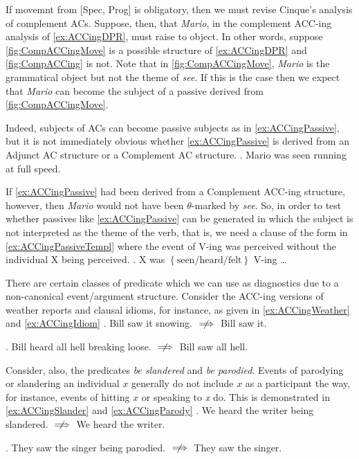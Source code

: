 \documentclass[MilwayThesis]{subfiles}
\begin{document}
If movemnt from [Spec, Prog] is obligatory, then we must revise Cinque's analysis of complement ACs.
Suppose, then, that \textit{Mario}, in the complement ACC-ing analysis of \cref{ex:ACCingDPR}, must raise to object.
In other words, suppose \cref{fig:CompACCingMove} is a possible structure of \cref{ex:ACCingDPR} and \cref{fig:CompACCing} is not.
Note that in \cref{fig:CompACCingMove}, \textit{Mario} is the grammatical object but not the theme of \textit{see}.
If this is the case then we expect that \textit{Mario} can become the subject of a passive derived from \cref{fig:CompACCingMove}.

Indeed, subjects of ACs can become passive subjects as in \cref{ex:ACCingPassive}, but it is not immediately obvious whether \cref{ex:ACCingPassive} is derived from an Adjunct AC structure or a Complement AC structure.
\ex. Mario was seen running at full speed. \label{ex:ACCingPassive}

If \cref{ex:ACCingPassive} had been derived from a Complement ACC-ing structure, however, then \textit{Mario} would not have been $\theta$-marked by \textit{see}.
So, in order to test whether passives like \cref{ex:ACCingPassive} can be generated in which the subject is not interpreted as the theme of the verb, that is, we need a clause of the form in \cref{ex:ACCingPassiveTempl} where the event of V-ing was perceived without the individual X being perceived.
\ex. X was $\left\{ \text{seen/heard/felt} \right\}$ V-ing \ldots

There are certain classes of predicate which we can use as diagnostics due to a non-canonical event/argument structure.
Consider the ACC-ing versions of weather reports and clausal idioms, for instance, as given in \cref{ex:ACCingWeather} and \cref{ex:ACCingIdiom}
\ex. Bill saw it snowing. $\centernot\implies$ Bill saw it. \label{ex:ACCingWeather}

\ex. Bill heard all hell breaking loose. $\centernot\implies$ Bill saw all hell. \label{ex:ACCingIdiom}

Consider, also, the predicates \textit{be slandered} and \textit{be parodied}.
Events of parodying or slandering an individual $x$ generally do not include $x$ as a participant the way, for instance, events of hitting $x$ or speaking to \textit{x} do.
This is demonstrated in \cref{ex:ACCingSlander} and \cref{ex:ACCingParody}
\ex. We heard the writer being slandered. $\centernot\implies$ We heard the writer. \label{ex:ACCingSlander}

\ex. They saw the singer being parodied. $\centernot\implies$ They saw the singer. \label{ex:ACCingParody}
\end{document}

